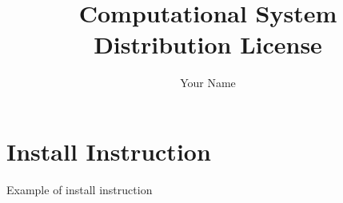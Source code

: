\documentclass{article}
\title{Computational System Distribution License}
\author{Your Name}
\begin{document}
\maketitle

\section*{Install Instruction}

Example of install instruction
\end{document}
